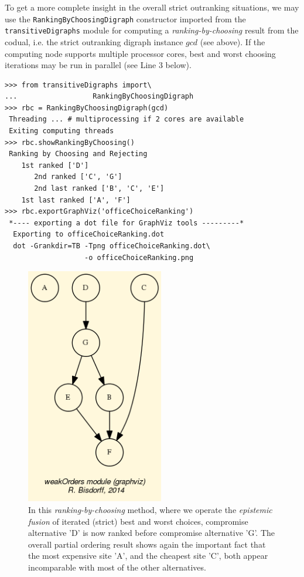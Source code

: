 To get a more complete insight in the overall strict outranking situations, we may use the \texttt{RankingByChoosingDigraph} constructor imported from the \texttt{transitiveDigraphs} module for computing a \emph{ranking-by-choosing} result from the codual, i.e. the strict outranking digraph instance $gcd$ (see above). If the computing node supports multiple processor cores, best and worst choosing iterations may be run in parallel (see Line 3 below).
\begin{lstlisting}
>>> from transitiveDigraphs import\
...                  RankingByChoosingDigraph
>>> rbc = RankingByChoosingDigraph(gcd)
 Threading ... # multiprocessing if 2 cores are available
 Exiting computing threads
>>> rbc.showRankingByChoosing()
 Ranking by Choosing and Rejecting
    1st ranked ['D']
       2nd ranked ['C', 'G']
       2nd last ranked ['B', 'C', 'E']
    1st last ranked ['A', 'F']
>>> rbc.exportGraphViz('officeChoiceRanking')
 *---- exporting a dot file for GraphViz tools ---------*
  Exporting to officeChoiceRanking.dot
  dot -Grankdir=TB -Tpng officeChoiceRanking.dot\
                   -o officeChoiceRanking.png
\end{lstlisting}
\begin{figure}[h]
\sidecaption[t]
\includegraphics[width=6cm]{Figures/officeChoiceRanking.png}
\caption{In this \emph{ranking-by-choosing} method, where we operate the \emph{epistemic fusion} of iterated (strict) best and worst choices, compromise alternative 'D' is now ranked before compromise alternative 'G'. The overall partial ordering result shows again the important fact that the most expensive site 'A', and the cheapest site 'C', both appear incomparable with most of the other alternatives.} 
\label{fig:6.5}       %
\end{figure}
	   
